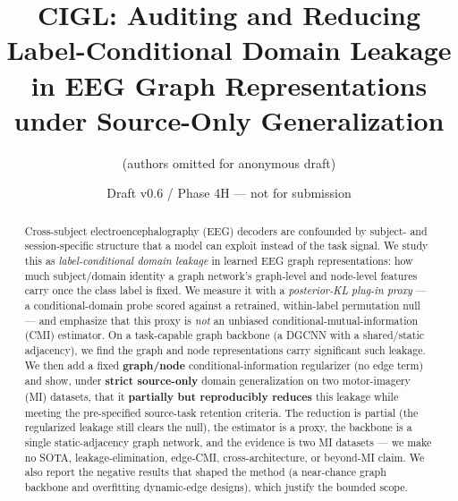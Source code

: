 \documentclass[11pt]{article}
\title{CIGL: Auditing and Reducing Label-Conditional Domain Leakage in EEG Graph
Representations under Source-Only Generalization}
\author{(authors omitted for anonymous draft)}
\date{Draft v0.6 / Phase 4H --- not for submission}
\begin{document}
\maketitle

\begin{abstract}
Cross-subject electroencephalography (EEG) decoders are confounded by subject- and session-specific
structure that a model can exploit instead of the task signal. We study this as \emph{label-conditional
domain leakage} in learned EEG graph representations: how much subject/domain identity a graph network's
graph-level and node-level features carry once the class label is fixed. We measure it with a
\emph{posterior-KL plug-in proxy} --- a conditional-domain probe scored against a retrained, within-label
permutation null --- and emphasize that this proxy is \emph{not} an unbiased conditional-mutual-information
(CMI) estimator. On a task-capable graph backbone (a DGCNN with a shared/static adjacency), we find the
graph and node representations carry significant such leakage. We then add a fixed \textbf{graph/node}
conditional-information regularizer (no edge term) and show, under \textbf{strict source-only} domain
generalization on two motor-imagery (MI) datasets, that it \textbf{partially but reproducibly reduces} this
leakage while meeting the pre-specified source-task retention criteria. The reduction is partial (the
regularized leakage still clears the null), the estimator is a proxy, the backbone is a single
static-adjacency graph network, and the evidence is two MI datasets --- we make no SOTA,
leakage-elimination, edge-CMI, cross-architecture, or beyond-MI claim. We also report the negative results
that shaped the method (a near-chance graph backbone and overfitting dynamic-edge designs), which justify
the bounded scope.
\end{abstract}











\end{document}
